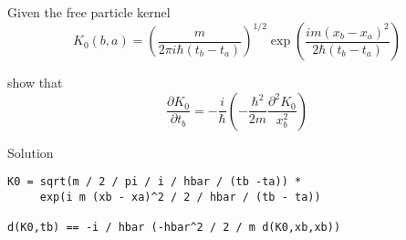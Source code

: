 \documentclass[12pt]{article}
\begin{document}
\noindent
Given the free particle kernel
\begin{equation*}
K_0(b,a)=\left(\frac{m}{2\pi i\hbar(t_b-t_a)}\right)^{1/2}
\exp\left(\frac{im(x_b-x_a)^2}{2\hbar(t_b-t_a)}\right)
\end{equation*}

\noindent
show that
\begin{equation*}
\frac{\partial K_0}{\partial t_b}
=-\frac{i}{\hbar}
\left(
-\frac{\hbar^2}{2m}
\frac{\partial^2 K_0}{x_b^2}
\right)
\end{equation*}

\bigskip
\noindent
Solution
\begin{verbatim}
K0 = sqrt(m / 2 / pi / i / hbar / (tb -ta)) *
     exp(i m (xb - xa)^2 / 2 / hbar / (tb - ta))

d(K0,tb) == -i / hbar (-hbar^2 / 2 / m d(K0,xb,xb))
\end{verbatim}
\end{document}
